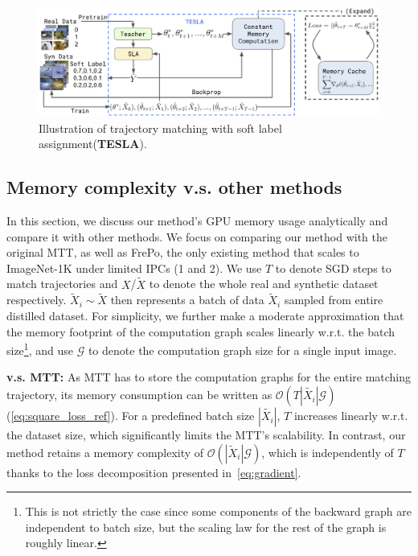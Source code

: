 \documentclass[10pt,twocolumn,letterpaper]{article}
\begin{document}
\begin{figure}
    \centering
        \includegraphics[width=\textwidth]{images/overview_drawing_new.png}
        \caption{Illustration of trajectory matching with soft label assignment(\textbf{TESLA}).}
        \label{fig:tesla}
\end{figure}

\subsection{Memory complexity v.s. other methods}
\label{sec.complexity}
In this section, we discuss our method's GPU memory usage analytically and compare it with other methods.   
We focus on comparing our method with the original MTT, as well as FrePo, the only existing method that scales to ImageNet-1K under limited IPCs (1 and 2).
We use $T$ to denote SGD steps to match trajectories and $X$/$\tilde{X}$ to denote the whole real and synthetic dataset respectively. $\tilde{X}_i \sim \tilde{X}$ then represents a batch of data $\tilde{X}_i$ sampled from entire distilled dataset. 
For simplicity, we further make a moderate approximation that the memory footprint of the computation graph scales linearly w.r.t. the batch size\footnote{This is not strictly the case since some components of the backward graph are independent to batch size, but the scaling law for the rest of the graph is roughly linear.}, and use $\mathcal{G}$ to denote the computation graph size for a single input image.

\textbf{v.s. MTT:} As MTT has to store the computation graphs for the entire matching trajectory, its memory consumption can be written as $\mathcal{O}(T |\tilde{X_i}| \mathcal{G})$ (\cref{eq:square_loss_ref}).
For a predefined batch size $|\tilde{X_i}|$, $T$ increases linearly w.r.t. the dataset size, which significantly limits the MTT's scalability.
In contrast, our method retains a memory complexity of $\mathcal{O}(|\tilde{X}_i|\mathcal{G})$, which is independently of $T$ thanks to the loss decomposition presented in~\cref{eq:gradient}.
\end{document}
